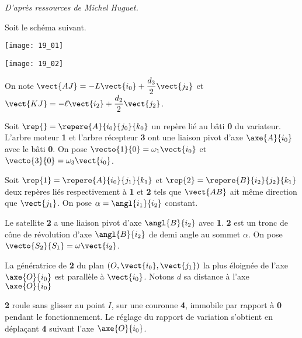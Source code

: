 \normalfalse \difficilefalse \tdifficiletrue
\correctionfalse


\begin{flushright}
\textit{D'après ressources de Michel Huguet.}
\end{flushright}
\setcounter{question}{0}
\ifcorrection
\else
{}
\fi

\ifprof
\else

Soit le schéma suivant. 
\begin{center}
\texttt{[image: 19\_01]}

\texttt{[image: 19\_02]}
\end{center}

On note
$\vect{AJ}=-L \vect{i_0}+\dfrac{d_3}{2}\vect{j_2}$
et 
$\vect{KJ}=-\ell \vect{i_2}+\dfrac{d_2}{2}\vect{j_2}$.

Soit $\rep{}=\repere{A}{i_0}{j_0}{k_0}$ un repère lié au bâti \textbf{0} du variateur. L’arbre moteur \textbf{1} et l’arbre récepteur
\textbf{3} ont une liaison pivot d’axe $\axe{A}{i_0}$ avec le bâti \textbf{0}. On pose $\vecto{1}{0}=\omega_1\vect{i_0}$ et $\vecto{3}{0}=\omega_3\vect{i_0}$. 

Soit $\rep{1}=\repere{A}{i_0}{j_1}{k_1}$  et $\rep{2}=\repere{B}{i_2}{j_2}{k_1}$ deux repères liés respectivement à \textbf{1} et \textbf{2} tels que $\vect{AB}$ ait même direction que  $\vect{j_1}$. On pose $\alpha =  \angl{i_1}{i_2}$ constant. 

Le satellite \textbf{2} a une liaison pivot d’axe $\angl{B}{i_2}$ avec \textbf{1}. \textbf{2} est un tronc de cône de
révolution d’axe $\angl{B}{i_2}$ de demi angle au sommet $\alpha$. On pose $\vecto{S_2}{S_1}=\omega\vect{i_2}$.

La génératrice de \textbf{2} du plan $\left(O,\vect{i_0},\vect{j_1} \right)$  la plus éloignée de l’axe $\axe{O}{i_0}$
 est parallèle à $\vect{i_0}$. Notons $d$ sa distance à l’axe $\axe{O}{i_0}$

\textbf{2} roule sans glisser au point $I$, sur une couronne \textbf{4}, immobile par rapport à \textbf{0} pendant le
fonctionnement. Le réglage du rapport de variation s’obtient en déplaçant \textbf{4} suivant l’axe
$\axe{O}{i_0}$.

